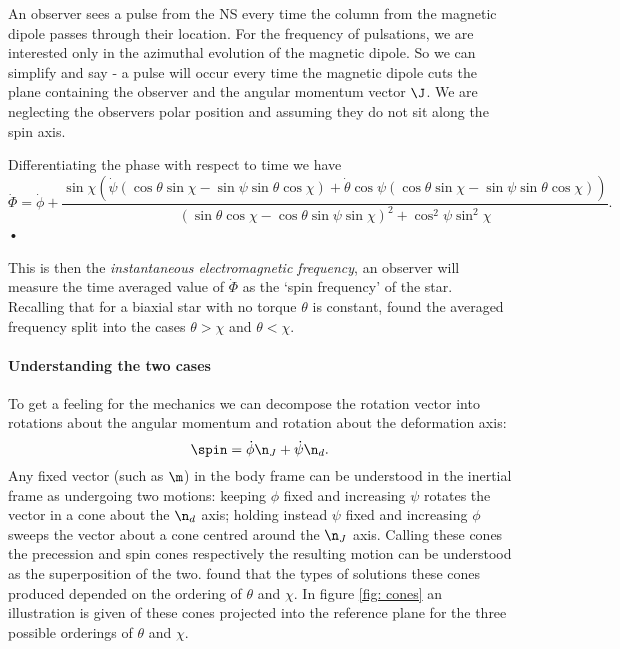 \documentclass[/home/greg/Thesis/main/main.tex]{subfiles}
\begin{document}
An observer sees a pulse from the NS every time the column from the magnetic
dipole passes through their location. For the frequency of pulsations, we are
interested only in the azimuthal evolution of the magnetic dipole. So we can 
simplify and say - a pulse
will occur every time the magnetic dipole cuts the plane containing the observer
and the angular momentum vector $\J$. We are neglecting the observers polar
position and assuming they do not sit along the spin axis.

Differentiating the phase with respect to time we have
\begin{equation}
\dot{\Phi} = \dot{\phi} 
+ \frac{\sin\chi \left(
\dot{\psi} (\cos\theta\sin\chi - \sin \psi \sin \theta \cos\chi) + 
\dot{\theta} \cos\psi (\cos\theta\sin\chi - \sin \psi \sin \theta \cos\chi)\right) 
}{(\sin\theta \cos \chi - \cos \theta \sin \psi \sin \chi)^{2} + \cos^{2}\psi \sin^{2} \chi}.
\label{eqn: Phi_dot}
\end{equation}•

This is then the \emph{instantaneous electromagnetic frequency}, an observer
will measure the time averaged value of $\dot{\Phi}$ as the `spin frequency' of
the star. Recalling that for a biaxial star with no torque $\theta$ is constant,
\citet{Jones2001} found the averaged frequency split into the cases 
$\theta > \chi$ and $\theta < \chi$.

\paragraph{Understanding the two cases}
To get a feeling for the mechanics we can decompose the rotation vector into 
rotations about the angular momentum and rotation about the deformation axis:
\begin{equation}
  \spin = \dot{\phi}\n_{J} + \dot{\psi}\n_{d}.
\label{eqn: decomp}
\end{equation}
Any fixed vector (such as $\m$) in the body frame can be understood in the
inertial frame as undergoing two motions: keeping $\phi$ fixed and increasing
$\psi$ rotates the vector in a cone about the $\n_{d}$ axis; holding instead
$\psi$ fixed and increasing $\phi$ sweeps the vector about a cone centred
around the $\n_{J}$ axis. Calling these cones the precession and spin cones
respectively the resulting motion can be understood as the superposition of the
two. \citet{Jones2001} found that the types of solutions these cones produced
depended on the ordering of $\theta$ and $\chi$. In figure \ref{fig: cones} an 
illustration is given of these cones
projected into the reference plane for the three possible orderings of $\theta$
and $\chi$. 
\end{document}
